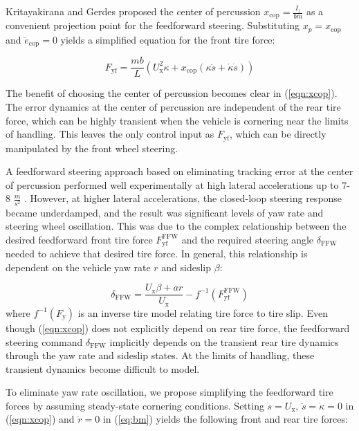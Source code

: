 \documentclass{nVSD2e}
\theoremstyle{plain}
\theoremstyle{definition}
\theoremstyle{remark}
\begin{document}
Kritayakirana and Gerdes \cite{mickcop} proposed the center of percussion $x_\mathrm{cop} = \frac{I_z}{bm}$ as a convenient projection point
for the feedforward steering. Substituting $x_p = x_\mathrm{cop}$ and $\ddot{e}_\mathrm{cop} = 0$  yields a simplified equation for the front tire force:

\begin{equation}
\label{eqn:xcop}
 F_\mathrm{yf} = \frac{mb}{L}(U_\mathrm{x}^2\kappa + x_\mathrm{cop}(\kappa\ddot{s} + \dot{\kappa}\dot{s}))
\end{equation}

The benefit of choosing the center of percussion becomes clear in (\ref{eqn:xcop}). The error dynamics at the
center of percussion are independent of the rear tire force, which can be highly transient when the vehicle is cornering near the
limits of handling. This leaves the only control input as $F_\mathrm{yf}$, which can be directly
manipulated by the front wheel steering. 

A feedforward steering approach based on eliminating tracking error at the center of percussion performed well experimentally at high lateral accelerations up to
7-8 $\frac{m}{s^2}$ \cite{mickcop}. However, at higher lateral accelerations, the closed-loop steering response became underdamped, and
the result was significant levels of yaw rate and steering wheel oscillation. This was due to the complex relationship between the 
desired feedforward front tire force $F^\mathrm{FFW}_\mathrm{yf}$ and the required steering angle $\delta_\mathrm{FFW}$ needed to achieve that desired tire force. 
In general, this relationship is dependent on the vehicle yaw rate $r$ and sideslip $\beta$:

\begin{equation}
\label{eqn:bikeffw}
\delta_\mathrm{FFW} = \frac{U_\mathrm{x}\beta + ar}{U_\mathrm{x}} - f^{-1}(F^\mathrm{FFW}_\mathrm{yf})
\end{equation}
where $f^{-1}(F_\mathrm{y})$ is an inverse tire model relating tire force to tire slip. Even though (\ref{eqn:xcop}) does not explicitly 
depend on  rear tire force, the feedforward steering command $\delta_\mathrm{FFW}$ implicitly depends on the transient
rear tire dynamics through the yaw rate and sideslip states. At the limits of handling, these transient dynamics become difficult to model.

To eliminate yaw rate oscillation, we propose simplifying the feedforward tire forces by assuming steady-state cornering conditions. Setting $\dot{s} = U_\mathrm{x}$, $\ddot{s} = \dot{\kappa} = 0$
in (\ref{eqn:xcop}) and $\dot{r} = 0$ in (\ref{eq:bm}) yields the following front and rear tire forces:
\end{document}
